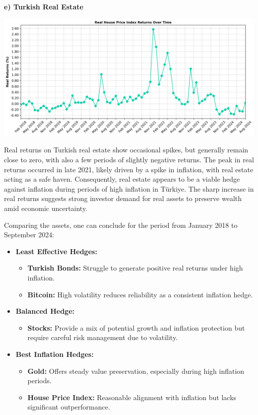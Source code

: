 \documentclass[
]{article}
\begin{document}
\textbf{e) Turkish Real Estate}

\includegraphics[width=\textwidth]{real_hpi_returns.png}

Real returns on Turkish real estate show occasional spikes, but generally remain close to zero, with also a few periods of slightly negative returns. The peak in real returns occurred in late 2021, likely driven by a spike in inflation, with real estate acting as a safe haven. Consequently, real estate appears to be a viable hedge against inflation during periods of high inflation in Türkiye. The sharp increase in real returns suggests strong investor demand for real assets to preserve wealth amid economic uncertainty.

Comparing the assets, one can conclude for the period from January 2018 to September 2024: 

\begin{itemize}
    \item \textbf{Least Effective Hedges:}
    \begin{itemize}
        \item \textbf{Turkish Bonds:} Struggle to generate positive real returns under high inflation.
        \item \textbf{Bitcoin:} High volatility reduces reliability as a consistent inflation hedge.
    \end{itemize}
    
    \item \textbf{Balanced Hedge:}
    \begin{itemize}
        \item \textbf{Stocks:} Provide a mix of potential growth and inflation protection but require careful risk management due to volatility.
    \end{itemize}
    
    \item \textbf{Best Inflation Hedges:}
    \begin{itemize}
        \item \textbf{Gold:} Offers steady value preservation, especially during high inflation periods.
        \item \textbf{House Price Index:} Reasonable alignment with inflation but lacks significant outperformance.
    \end{itemize}
\end{itemize}
\end{document}
